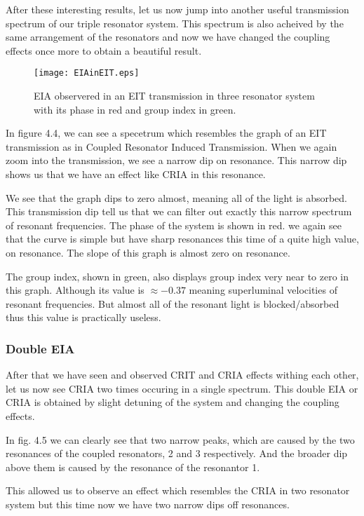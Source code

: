 After these interesting results, let us now jump into another useful transmission spectrum of our triple resonator system. This spectrum is also acheived by the same arrangement of the resonators and now we have changed the coupling effects once more to obtain a beautiful result. 

\begin{figure}[h]
\centering
\texttt{[image: EIAinEIT.eps]}
\caption{EIA observered in an EIT transmission in three resonator system with its phase in red and group index in green.}
\end{figure}

In figure 4.4, we can see a specetrum which resembles the graph of an EIT transmission as in Coupled Resonator Induced Transmission. When we again zoom into the transmission, we see a narrow dip on resonance. This narrow dip shows us that we have an effect like CRIA in this resonance. 

We see that the graph dips to zero almost, meaning all of the light is absorbed. This transmission dip tell us that we can filter out exactly this narrow spectrum of resonant frequencies. 
The phase of the system is shown in red. we again see that the curve is simple but have sharp resonances this time of a quite high value, on resonance. The slope of this graph is almost zero on resonance.

The group index, shown in green, also displays group index very near to zero in this graph. Although its value is $\approx -0.37$ meaning superluminal velocities of resonant frequencies. But almost all of the resonant light is blocked/absorbed thus this value is practically useless.

\subsubsection{Double EIA}
After that we have seen and observed CRIT and CRIA effects withing each other, let us now see CRIA two times occuring in a single spectrum. This double EIA or CRIA is obtained by slight detuning of the system and changing the coupling effects. 

In fig. 4.5 we can clearly see that two narrow peaks, which are caused by the two resonances of the coupled resonators, 2 and 3 respectively. And the broader dip above them is caused by the resonance of the resonantor 1. 


This allowed us to observe an effect which resembles the CRIA in two resonator system but this time now we have two narrow dips off resonances.

